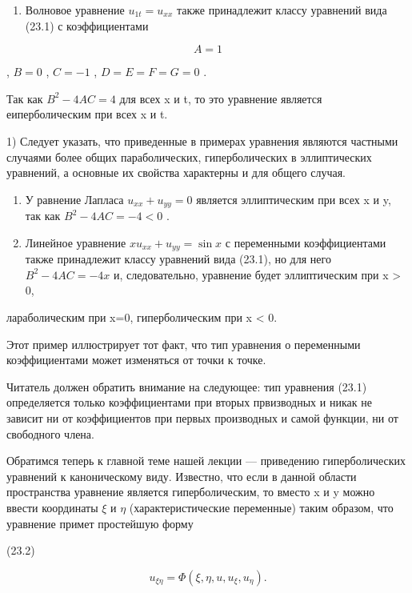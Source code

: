 \documentclass[
  ukrainian,
]{article}
\providecommand{\tightlist}{%
  \setlength{\itemsep}{0pt}\setlength{\parskip}{0pt}}
\begin{document}
\begin{enumerate}
\def\labelenumi{\arabic{enumi}.}
\setcounter{enumi}{1}
\tightlist
\item
  Волновое уравнение \(u_{1t} = u_{xx}\) также принадлежит классу
  уравнений вида (23.1) с коэффициентами
\end{enumerate}

\[
A=1
\]

, \(B=0\) , \(C=-1\) , \(D=E=F=G=0\) .

Так как \(B^2 - 4AC = 4\) для всех x и t, то это уравнение является
еиперболическим при всех x и t.

1) Следует указать, что приведенные в примерах уравнения являются
частными случаями более общих параболических, гиперболических в
эллиптических уравнений, а основные их свойства характерны и для общего
случая.

\begin{enumerate}
\def\labelenumi{\arabic{enumi}.}
\setcounter{enumi}{2}
\item
  У равнение Лапласа \(u_{xx} + u_{yy} = 0\) является эллиптическим при
  всех x и y, так как \(B^2 - 4AC = - 4 < 0\) .
\item
  Линейное уравнение \(xu_{xx} + u_{yy} = \sin x\) с переменными
  коэффициентами также принадлежит классу уравнений вида (23.1), но для
  него \(B^2-4AC=-4x\) и, следовательно, уравнение будет эллиптическим
  при x \textgreater{} 0,
\end{enumerate}

лараболическим при x=0, гиперболическим при x \textless{} 0.

Этот пример иллюстрирует тот факт, что тип уравнения о переменными
коэффициентами может изменяться от точки к точке.

Читатель должен обратить внимание на следующее: тип уравнения (23.1)
определяется только коэффициентами при вторых првизводных и никак не
зависит ни от коэффициентов при первых производных и самой функции, ни
от свободного члена.

Обратимся теперь к главной теме нашей лекции --- приведению
гиперболических уравнений к каноническому виду. Известно, что если в
данной области пространства уравнение является гиперболическим, то
вместо x и y можно ввести координаты \(\xi\) и \(\eta\)
(характеристические переменные) таким образом, что уравнение примет
простейшую форму

(23.2)

\[
u_{\xi\eta} = \Phi(\xi, \eta, u, u_{\xi}, u_{\eta}).
\]
\end{document}
